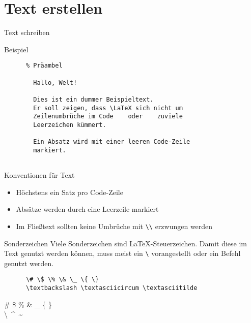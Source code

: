 \section{Text erstellen}

\begin{frame}[fragile]{Text schreiben}
  \begin{block}{Beispiel}
    \begin{lstlisting}
      % Präambel
      
        Hallo, Welt!

        Dies ist ein dummer Beispieltext.
        Er soll zeigen, dass \LaTeX sich nicht um
        Zeilenumbrüche im Code    oder    zuviele
        Leerzeichen kümmert.

        Ein Absatz wird mit einer leeren Code-Zeile
        markiert.
      
    \end{lstlisting}
  \end{block}
\end{frame}

\begin{frame}[fragile]{Konventionen für Text}
  \begin{itemize}
    \item Höchstens ein Satz pro Code-Zeile
    \item Absätze werden durch eine Leerzeile markiert
    \item Im Fließtext sollten keine Umbrüche mit \lstinline+\\+ erzwungen werden
  \end{itemize}
  \begin{alertblock}{Sonderzeichen}
    Viele Sonderzeichen sind \LaTeX-Steuerzeichen.
    Damit diese im Text genutzt werden können, muss meist ein \verb+\+ vorangestellt oder ein Befehl genutzt werden.
  \end{alertblock}
  \begin{CodeExample}{0.7}
    \begin{lstlisting}
      \# \$ \% \& \_ \{ \}
      \textbackslash \textasciicircum \textasciitilde
    \end{lstlisting}
  \CodeResult
    \strut
    \# \$ \% \& \_ \{ \} \\
    \textbackslash\ \textasciicircum\ \textasciitilde
  \end{CodeExample}
\end{frame}

